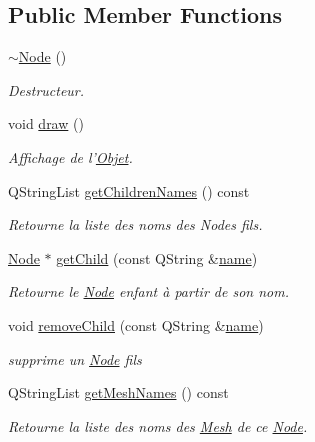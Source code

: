 \subsection*{Public Member Functions}
\begin{DoxyCompactItemize}
\item 
\hyperlink{class_node_aa0840c3cb5c7159be6d992adecd2097c}{$\sim$\+Node} ()
\begin{DoxyCompactList}\small\item\em Destructeur. \end{DoxyCompactList}\item 
void \hyperlink{class_node_ab88c83ced58700a56de568f5b1e3c473}{draw} ()
\begin{DoxyCompactList}\small\item\em Affichage de l'\hyperlink{class_objet}{Objet}. \end{DoxyCompactList}\item 
Q\+String\+List \hyperlink{class_node_af7d6e2eab0af346f6690b4a2db12d953}{get\+Children\+Names} () const 
\begin{DoxyCompactList}\small\item\em Retourne la liste des noms des Nodes fils. \end{DoxyCompactList}\item 
\hyperlink{class_node}{Node} $\ast$ \hyperlink{class_node_afdc8a8f6c370f437037c85ffea5af4c1}{get\+Child} (const Q\+String \&\hyperlink{class_objet_a4a702c189bedcbf1e65da6aec72c8e44}{name})
\begin{DoxyCompactList}\small\item\em Retourne le \hyperlink{class_node}{Node} enfant à partir de son nom. \end{DoxyCompactList}\item 
void \hyperlink{class_node_af93b38928dc99bd2d3b1bfd982898519}{remove\+Child} (const Q\+String \&\hyperlink{class_objet_a4a702c189bedcbf1e65da6aec72c8e44}{name})
\begin{DoxyCompactList}\small\item\em supprime un \hyperlink{class_node}{Node} fils \end{DoxyCompactList}\item 
Q\+String\+List \hyperlink{class_node_a4a3bbcabcbd5423c297e287dd0ab7ecd}{get\+Mesh\+Names} () const 
\begin{DoxyCompactList}\small\item\em Retourne la liste des noms des \hyperlink{class_mesh}{Mesh} de ce \hyperlink{class_node}{Node}. \end{DoxyCompactList}\item 

\end{DoxyCompactItemize}
